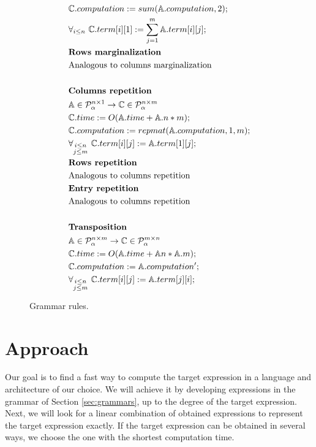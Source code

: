 \begin{figure}
\begin{framed}
\begin{align*}
&\mathbb{C}.computation := sum(\mathbb{A}.computation, 2); \\
&\forall_{i \leq n}\text{ }\mathbb{C}.term[i][1] := \sum_{j = 1}^m \mathbb{A}.term[i][j];\\
&\text{{\bf Rows marginalization}}\\
&\text{Analogous to columns marginalization} \\
& \\
&\text{{\bf Columns repetition}}\\
&\mathbb{A} \in \mathcal{P}^{n \times 1}_\alpha \rightarrow \mathbb{C} \in \mathcal{P}^{n \times m}_\alpha \\
&\mathbb{C}.time := O(\mathbb{A}.time + \mathbb{A}.n * m);\\
&\mathbb{C}.computation := repmat(\mathbb{A}.computation, 1, m); \\
&\forall_{\substack{i \leq n\\ j \leq  m}}\text{ } \mathbb{C}.term[i][j] := \mathbb{A}.term[1][j];\\
&\text{{\bf Rows repetition}}\\
&\text{Analogous to columns repetition} \\
&\text{{\bf Entry repetition}}\\
&\text{Analogous to columns repetition} \\
& \\
&\text{{\bf Transposition}}\\
&\mathbb{A} \in \mathcal{P}^{n \times m}_\alpha \rightarrow \mathbb{C} \in \mathcal{P}^{m \times n}_\alpha\\
&\mathbb{C}.time := O(\mathbb{A}.time + \mathbb{A}n * \mathbb{A}.m);\\
&\mathbb{C}.computation := \mathbb{A}.computation';\\
&\forall_{\substack{i \leq n\\j \leq m}}\text{ } \mathbb{C}.term[i][j] := \mathbb{A}.term[j][i];
\end{align*}
\caption{Grammar rules.}
\label{fig:rules}
\end{framed}
\end{figure}

\section{Approach}\label{sec:admissible}

Our goal is to find a fast way to compute the target expression in
a language and architecture of our choice. We will achieve it by
developing expressions in the grammar of Section \ref{sec:grammars}, up to the degree of the target
expression. Next, we will look for a linear combination of obtained
expressions to represent the target expression exactly. If the target expression
can be obtained in several ways, we choose the one with the shortest
computation time.


